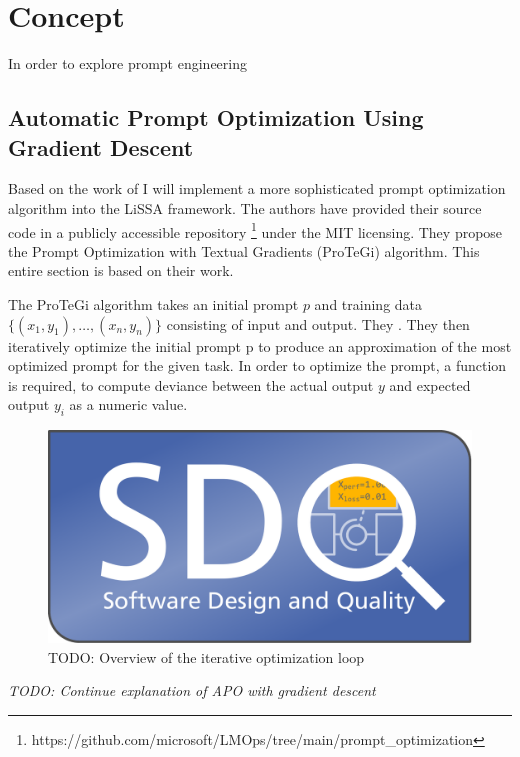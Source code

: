 \chapter{Concept}
\label{conecpt}

In order to explore prompt engineering

\section{Automatic Prompt Optimization Using Gradient Descent}
Based on the work of  I will implement a more sophisticated prompt optimization algorithm into the LiSSA framework. The authors have provided their source code in a publicly accessible repository \footnote{https://github.com/microsoft/LMOps/tree/main/prompt\_optimization} under the MIT licensing. They propose the Prompt Optimization with Textual Gradients (ProTeGi) algorithm. This entire section is based on their work.

The ProTeGi algorithm takes an initial prompt $p$ and training data $\{(x_1, y_1), \dots, (x_n, y_n)\}$ consisting of input and output. They . They then iteratively optimize the initial prompt p to produce an approximation of the most optimized prompt for the given task. In order to optimize the prompt, a function is required, to compute deviance between the actual output $y$ and expected output $y_i$ as a numeric value.

\begin{figure}[h]
\centering
\includegraphics[width=12cm]{logos/sdqlogo}
\caption{TODO: Overview of the iterative optimization loop}
\label{fig:sdqlogo}
\end{figure}

\textit{TODO: Continue explanation of APO with gradient descent}

